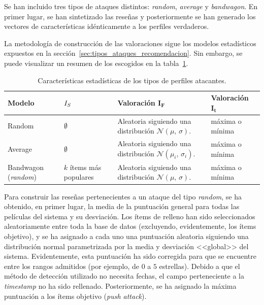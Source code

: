 Se han incluido tres tipos de ataques distintos: \textit{random}, \textit{average} y \textit{bandwagon}. En primer lugar, se han sintetizado las reseñas y posteriormente se han generado los vectores de características idénticamente a los perfiles verdaderos.

La metodología de construcción de las valoraciones sigue los modelos estadísticos expuestos en la sección~\ref{sec:tipos_ataques_recomendacion}. Sin embargo, se puede visualizar un resumen de los escogidos en la tabla~\ref{ataques_coforest}.

\begin{table}
\begin{centering}
	\begin{tabular}{@{}p{5em} p{6em} p{11em} p{8em}@{}}
		\toprule
		\textbf{Modelo} & $\hfil{I_S}$ & \textbf{Valoración} $\mathbf{I_F}$ &  \textbf{Valoración} $\mathbf{I_t}$\\ 
		\midrule
		Random & $\hfil\emptyset$ & Aleatoria siguiendo una distribución $\mathcal{N}(\mu,\,\sigma)$. & máxima o mínima \\
		Average & $\hfil\emptyset$ & Aleatoria siguiendo una distribución $\mathcal{N}(\mu_i,\,\sigma_i)$. & máxima o mínima\\
		Bandwagon (\textit{random}) &\centering$k$ ítems más populares & Aleatoria siguiendo una distribución $\mathcal{N}(\mu,\,\sigma)$. & máxima o mínima\\
		\bottomrule
	\end{tabular}
	\caption[Experimentación: características de ataques a detectar]{Características estadísticas de los tipos de perfiles atacantes.}
	\label{ataques_coforest}	
\end{centering}
\end{table}

Para construir las reseñas pertenecientes a un ataque del tipo \textit{random}, se ha obtenido, en primer lugar, la media de la puntuación general para todas las películas del sistema y su desviación. Los ítems de relleno han sido seleccionados aleatoriamente entre toda la base de datos (excluyendo, evidentemente, los ítems objetivo), y se ha asignado a cada uno una puntuación aleatoria siguiendo una distribución normal parametrizada por la media y desviación <<global>> del sistema. Evidentemente, esta puntuación ha sido corregida para que se encuentre entre los rangos admitidos (por ejemplo, de $0$ a $5$ estrellas). Debido a que el método de detección utilizado no necesita fechas, el campo perteneciente a la \textit{timestamp} no ha sido rellenado. Posteriormente, se ha asignado la máxima puntuación a los ítems objetivo (\textit{push attack}).

